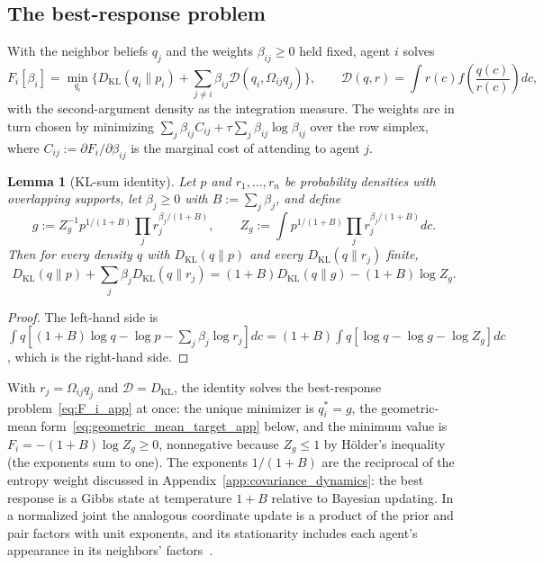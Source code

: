 \documentclass[11pt]{article}
\newtheorem{lemma}{Lemma}
\begin{document}
\subsection*{The best-response problem}

With the neighbor beliefs $q_j$ and the weights $\beta_{ij} \geq 0$ held fixed, agent $i$ solves
\begin{equation}
F_i[\beta_i]
=\min_{q_i}
\Big\{
D_{\mathrm{KL}}(q_i \| p_i)
+ \sum_{j\neq i} \beta_{ij}\mathcal{D}(q_i,\Omega_{ij}q_j)
\Big\},
\qquad
\mathcal{D}(q, r) = \int r(c) f\left(\frac{q(c)}{r(c)}\right)dc,
\label{eq:F_i_app}
\end{equation}
with the second-argument density as the integration measure. The weights are in turn chosen by minimizing $\sum_{j}\beta_{ij}C_{ij} + \tau\sum_{j}\beta_{ij}\log\beta_{ij}$ over the row simplex, where $C_{ij} := \partial F_i/\partial\beta_{ij}$ is the marginal cost of attending to agent $j$.

\begin{lemma}[KL-sum identity]
\label{lem:kl_sum_identity}
Let $p$ and $r_1, \dots, r_n$ be probability densities with overlapping supports, let $\beta_j \geq 0$ with $B := \sum_j\beta_j$, and define
\begin{equation}
g := Z_g^{-1}p^{1/(1+B)}\prod_j r_j^{\beta_j/(1+B)},
\qquad
Z_g := \int p^{1/(1+B)}\prod_j r_j^{\beta_j/(1+B)}dc.
\end{equation}
Then for every density $q$ with $D_{\mathrm{KL}}(q\|p)$ and every $D_{\mathrm{KL}}(q\|r_j)$ finite,
\begin{equation}
D_{\mathrm{KL}}(q\|p) + \sum_j\beta_jD_{\mathrm{KL}}(q\|r_j) = (1+B)D_{\mathrm{KL}}(q\|g) - (1+B)\log Z_g.
\label{eq:kl_sum_identity}
\end{equation}
\end{lemma}

\begin{proof}
The left-hand side is $\int q[(1+B)\log q - \log p - \sum_j\beta_j\log r_j]dc = (1+B)\int q[\log q - \log g - \log Z_g]dc$, which is the right-hand side.
\end{proof}

With $r_j = \Omega_{ij}q_j$ and $\mathcal{D} = D_{\mathrm{KL}}$, the identity solves the best-response problem~\eqref{eq:F_i_app} at once: the unique minimizer is $q_i^* = g$, the geometric-mean form~\eqref{eq:geometric_mean_target_app} below, and the minimum value is $F_i = -(1+B)\log Z_g \geq 0$, nonnegative because $Z_g \leq 1$ by H\"older's inequality (the exponents sum to one). The exponents $1/(1+B)$ are the reciprocal of the entropy weight discussed in Appendix~\ref{app:covariance_dynamics}: the best response is a Gibbs state at temperature $1+B$ relative to Bayesian updating. In a normalized joint the analogous coordinate update is a product of the prior and pair factors with unit exponents, and its stationarity includes each agent's appearance in its neighbors' factors~\cite[Ch.~5, local Gibbs bound and exact block E-coordinate]{DennisGaugeVFE2026}.
\end{document}

